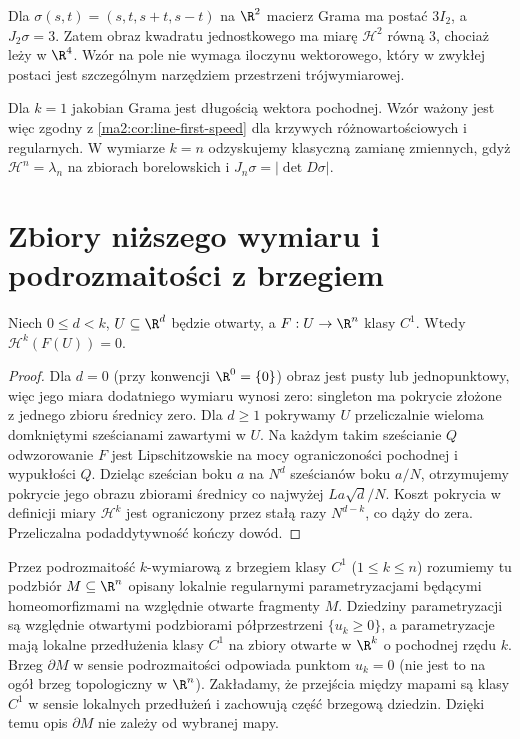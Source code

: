 \begin{przyklad}
\label{ma2:ex:surface-codimension-two}
Dla $\sigma(s,t)=(s,t,s+t,s-t)$ na $\R^2$
macierz Grama ma postać $3I_2$, a $J_2\sigma=3$.
Zatem obraz kwadratu jednostkowego ma miarę
$\mathcal H^2$ równą $3$, chociaż leży w $\R^4$.
Wzór na pole nie wymaga iloczynu wektorowego,
który w zwykłej postaci jest szczególnym
narzędziem przestrzeni trójwymiarowej.
\end{przyklad}

Dla $k=1$ jakobian Grama jest długością wektora
pochodnej. Wzór ważony jest więc zgodny z
\ref{ma2:cor:line-first-speed} dla krzywych
różnowartościowych i regularnych.
W wymiarze $k=n$ odzyskujemy klasyczną zamianę
zmiennych, gdyż $\mathcal H^n=\lambda_n$
na zbiorach borelowskich i
$J_n\sigma=|\det D\sigma|$.

\section{Zbiory niższego wymiaru i podrozmaitości z brzegiem}

\begin{lemat}
\label{ma2:lem:surface-lower-dimension}
Niech $0\le d<k$, $U\subseteq\R^d$ będzie otwarty,
a $F:U\to\R^n$ klasy $C^1$.
Wtedy $\mathcal H^k(F(U))=0$.
\end{lemat}
\begin{proof}
Dla $d=0$ (przy konwencji $\R^0=\{0\}$)
obraz jest pusty lub jednopunktowy, więc jego
miara dodatniego wymiaru wynosi zero: singleton
ma pokrycie złożone z jednego zbioru średnicy zero.
Dla $d\ge1$ pokrywamy $U$ przeliczalnie
wieloma domkniętymi sześcianami zawartymi w $U$.
Na każdym takim sześcianie $Q$ odwzorowanie $F$
jest Lipschitzowskie na mocy ograniczoności
pochodnej i wypukłości $Q$.
Dzieląc sześcian boku $a$ na $N^d$ sześcianów
boku $a/N$, otrzymujemy pokrycie jego obrazu
zbiorami średnicy co najwyżej $La\sqrt d/N$.
Koszt pokrycia w definicji miary $\mathcal H^k$
jest ograniczony przez stałą razy $N^{d-k}$,
co dąży do zera. Przeliczalna podaddytywność
kończy dowód.
\end{proof}

Przez podrozmaitość $k$-wymiarową z brzegiem klasy $C^1$
($1\le k\le n$) rozumiemy tu podzbiór $M\subseteq\R^n$ opisany lokalnie
regularnymi parametryzacjami będącymi homeomorfizmami
na względnie otwarte fragmenty $M$. Dziedziny
parametryzacji są względnie otwartymi podzbiorami
półprzestrzeni $\{u_k\ge0\}$, a parametryzacje
mają lokalne przedłużenia klasy $C^1$ na zbiory
otwarte w $\R^k$ o pochodnej rzędu $k$.
Brzeg $\partial M$ w sensie podrozmaitości
odpowiada punktom $u_k=0$ (nie jest to na ogół
brzeg topologiczny w $\R^n$).
Zakładamy, że przejścia między mapami są klasy $C^1$
w sensie lokalnych przedłużeń i zachowują
część brzegową dziedzin. Dzięki temu opis
$\partial M$ nie zależy od wybranej mapy.

